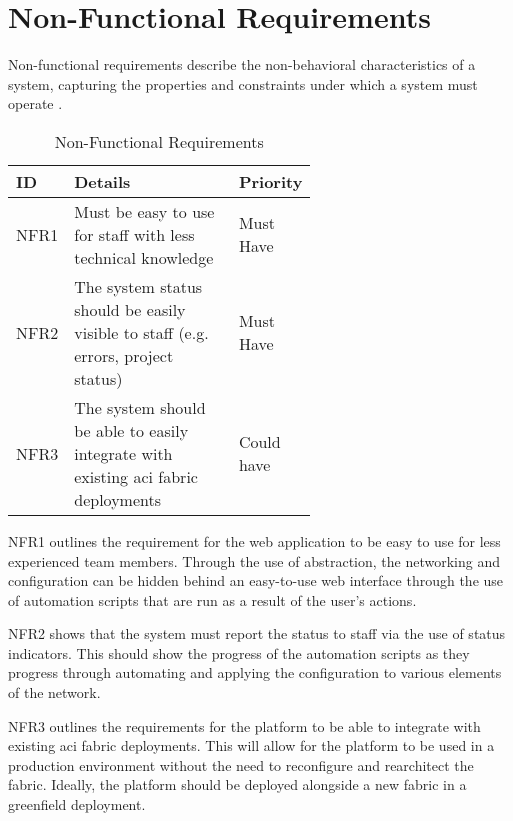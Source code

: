 \section{Non-Functional Requirements}
Non-functional requirements describe the non-behavioral characteristics of a system, capturing the properties and constraints under which a system must operate \citep{12}.
\begin{center}
    \begin{table}[H]
        \begin{tabular}{l p{0.6\linewidth} l}
            \hline
            \textbf{ID}             & \textbf{Details}
                                    & \textbf{Priority}
            \\ \hline
            NFR1                    & Must be easy to use for staff with less technical
            knowledge
                                    & Must Have
            \\ \hline
            NFR2                    & The system status should be easily visible to staff (e.g.
            errors, project status) & Must Have                                                                                       \\ \hline
            NFR3                    & The system should be able to easily integrate with existing \gls{aci} fabric deployments & Could have
        \end{tabular}
        \caption{Non-Functional Requirements}
        \label{requirements:non-functional}
    \end{table}
\end{center}

NFR1 outlines the requirement for the web application to be easy to use for less experienced team members. Through the use of abstraction, the networking and configuration can be hidden behind an easy-to-use web interface through the use of automation scripts that are run as a result of the user's actions.

NFR2 shows that the system must report the status to staff via the use of status indicators. This should show the progress of the automation scripts as they progress through automating and applying the configuration to various elements of the network.

NFR3 outlines the requirements for the platform to be able to integrate with existing \gls{aci} fabric deployments. This will allow for the platform to be used in a production environment without the need to reconfigure and rearchitect the fabric. Ideally, the platform should be deployed alongside a new fabric in a greenfield deployment.